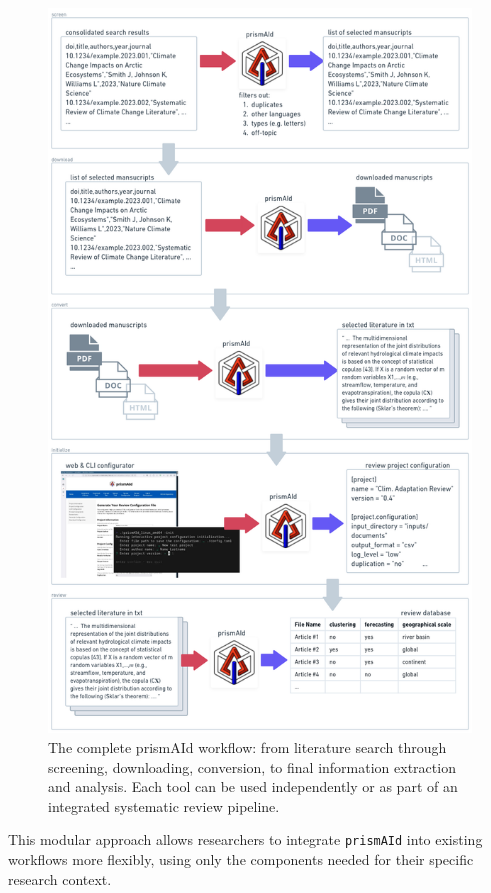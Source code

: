 \begin{figure}[h]
    \centering
    \includegraphics[width=\textwidth]{figures/prismAId_workflow.png}
    \caption{The complete prismAId workflow: from literature search through screening, downloading, conversion, to final information extraction and analysis. Each tool can be used independently or as part of an integrated systematic review pipeline.}
    \label{fig:workflow_overview}
\end{figure}

This modular approach allows researchers to integrate \texttt{prismAId} into existing workflows more flexibly, using only the components needed for their specific research context.

